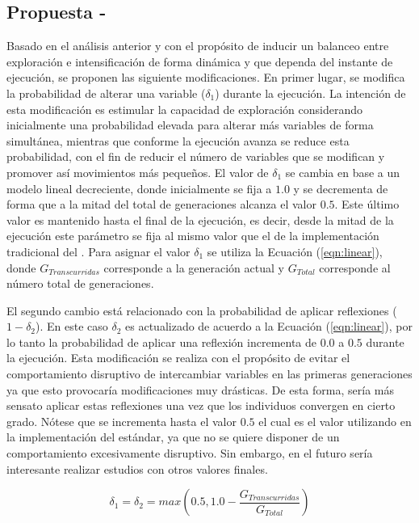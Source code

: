 \subsection{Propuesta - \DSBX{}}

Basado en el análisis anterior y con el propósito de inducir un balanceo entre exploración e intensificación de forma dinámica y que dependa del instante de ejecución, 
se proponen las siguiente modificaciones.
%
En primer lugar, se modifica la probabilidad de alterar una variable ($\delta_1$) durante la ejecución.
%
La intención de esta modificación es estimular la capacidad de exploración considerando inicialmente una probabilidad elevada 
para alterar más variables de forma simultánea, mientras que conforme la ejecución avanza se reduce esta probabilidad, con el fin de reducir
el número de variables que se modifican y promover así movimientos más pequeños.
%
El valor de $\delta_1$ se cambia en base a un modelo lineal decreciente, donde inicialmente se fija a $1.0$ y se decrementa de forma
que a la mitad del total de generaciones alcanza el valor $0.5$.
%
Este último valor es mantenido hasta el final de la ejecución, es decir, desde la mitad de la ejecución este parámetro se fija 
al mismo valor que el de la implementación tradicional del \SBX{}.
%
Para asignar el valor $\delta_1$ se utiliza la Ecuación (\ref{eqn:linear}), donde $G_{Transcurridas}$ corresponde a la generación actual 
y $G_{Total}$ corresponde al número total de generaciones.

El segundo cambio está relacionado con la probabilidad de aplicar reflexiones ($1 - \delta_2$).
%
En este caso $\delta_2$ es actualizado de acuerdo a la Ecuación (\ref{eqn:linear}), por lo tanto la probabilidad de aplicar una reflexión 
incrementa de $0.0$ a $0.5$ durante la ejecución.
%
Esta modificación se realiza con el propósito de evitar el comportamiento disruptivo de intercambiar variables en las primeras generaciones 
ya que esto provocaría modificaciones muy drásticas.
%
De esta forma, sería más sensato aplicar estas reflexiones una vez que los individuos convergen en cierto grado.
%
Nótese que se incrementa hasta el valor $0.5$ el cual es el valor utilizando en la implementación del \SBX{} estándar, ya que no se quiere
disponer de un comportamiento excesivamente disruptivo.
%
Sin embargo, en el futuro sería interesante realizar estudios con otros valores finales.

\begin{equation}\label{eqn:linear}
	\delta_1 = \delta_2 = max \left (0.5, 1.0 - \frac{G_{Transcurridas}}{G_{Total}} \right )
\end{equation}

